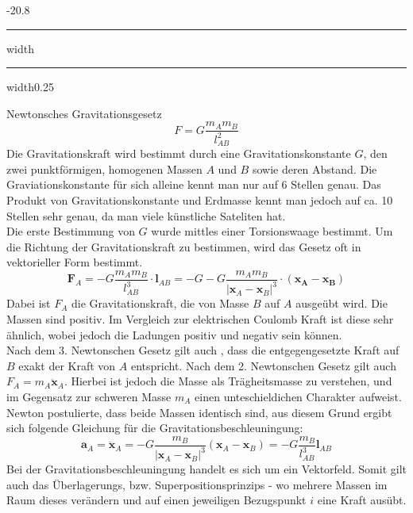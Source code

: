 \documentclass[9pt, landscape, fleqn]{scrartcl}
\makeatletter
\renewcommand{\subsection}{\@startsection{subsection}{1}{0mm}%
{-2\baselineskip}{0.8\baselineskip}%
{\hrule depth 0.2pt width\columnwidth\hrule depth0.75pt
width0.25\columnwidth\vspace*{1.2em}\large\bfseries\rmfamily}}
\makeatother
\begin{document}
\begin{multicols*}{3}
\subsection{Newtonsches Gravitationsgesetz}
\begin{equation*}
    F = G \frac{m_A m_B}{l^2_{AB}}
\end{equation*}
Die Gravitationskraft wird bestimmt durch eine Gravitationskonstante $G$, den zwei punktförmigen, homogenen Massen $A$ und $B$ sowie deren Abstand. Die Graviationskonstante für sich alleine kennt man nur auf 6 Stellen genau. Das Produkt von Gravitationskonstante und Erdmasse kennt man jedoch auf ca. 10 Stellen sehr genau, da man viele künstliche Sateliten hat. \\

Die erste Bestimmung von $G$ wurde mittles einer Torsionswaage bestimmt. Um die Richtung der Gravitationskraft zu bestimmen, wird das Gesetz oft in vektorieller Form bestimmt.
\begin{equation*}
    \mathbf{F}_A = -G \frac{m_A m_B}{l^3_{AB}}\cdot \mathbf{l}_{AB} = -G -G \frac{m_A m_B}{|\mathbf{x}_A - \mathbf{x}_B|^3}\cdot (\mathbf{x_A} - \mathbf{x_B})
\end{equation*}
Dabei ist $F_A$ die Gravitationskraft, die von Masse $B$ auf $A$ ausgeübt wird. Die Massen sind positiv. Im Vergleich zur elektrischen Coulomb Kraft ist diese sehr ähnlich, wobei jedoch die Ladungen positiv und negativ sein können. \\

Nach dem 3. Newtonschen Gesetz gilt auch , dass die entgegengesetzte Kraft auf $B$ exakt der Kraft von $A$ entspricht. Nach dem 2. Newtonschen Gesetz gilt auch $F_A = m_A \mathbf{\ddot{x}}_A$. Hierbei ist jedoch die Masse als Trägheitsmasse zu verstehen, und im Gegensatz zur schweren Masse $m_A$ einen unteschieldichen Charakter aufweist. Newton postulierte, dass beide Massen identisch sind, aus diesem Grund ergibt sich folgende Gleichung für die Gravitationsbeschleuningung:
\begin{equation*}
    \mathbf{a}_A = \ddot{\mathbf{x}}_A = -G \frac{m_B}{|\mathbf{x}_A - \mathbf{x}_B|^3}(\mathbf{x}_A - \mathbf{x}_B) = - G \frac{m_B}{l^3_{AB}}\mathbf{l}_{AB}
\end{equation*}
Bei der Gravitationsbeschleuningung handelt es sich um ein Vektorfeld. Somit gilt auch das Überlagerungs, bzw. Superpositionsprinzips - wo mehrere Massen im Raum dieses verändern und auf einen jeweiligen Bezugspunkt $i$ eine Kraft ausübt. \\


\end{multicols*}
\end{document}
